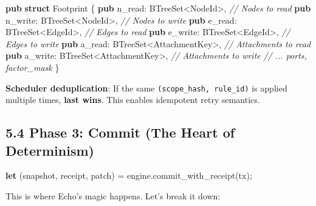 \documentclass[
  11pt,
]{book}
\newenvironment{Shaded}{}{}
\newcommand{\CommentTok}[1]{\textcolor[rgb]{0.38,0.63,0.69}{\textit{#1}}}
\newcommand{\KeywordTok}[1]{\textcolor[rgb]{0.00,0.44,0.13}{\textbf{#1}}}
\newcommand{\NormalTok}[1]{#1}
\newcommand{\OperatorTok}[1]{\textcolor[rgb]{0.40,0.40,0.40}{#1}}
\begin{document}
\begin{Shaded}
\begin{Highlighting}[]
\KeywordTok{pub} \KeywordTok{struct}\NormalTok{ Footprint }\OperatorTok{\{}
    \KeywordTok{pub}\NormalTok{ n\_read}\OperatorTok{:}\NormalTok{ BTreeSet}\OperatorTok{\textless{}}\NormalTok{NodeId}\OperatorTok{\textgreater{},}   \CommentTok{// Nodes to read}
    \KeywordTok{pub}\NormalTok{ n\_write}\OperatorTok{:}\NormalTok{ BTreeSet}\OperatorTok{\textless{}}\NormalTok{NodeId}\OperatorTok{\textgreater{},}  \CommentTok{// Nodes to write}
    \KeywordTok{pub}\NormalTok{ e\_read}\OperatorTok{:}\NormalTok{ BTreeSet}\OperatorTok{\textless{}}\NormalTok{EdgeId}\OperatorTok{\textgreater{},}   \CommentTok{// Edges to read}
    \KeywordTok{pub}\NormalTok{ e\_write}\OperatorTok{:}\NormalTok{ BTreeSet}\OperatorTok{\textless{}}\NormalTok{EdgeId}\OperatorTok{\textgreater{},}  \CommentTok{// Edges to write}
    \KeywordTok{pub}\NormalTok{ a\_read}\OperatorTok{:}\NormalTok{ BTreeSet}\OperatorTok{\textless{}}\NormalTok{AttachmentKey}\OperatorTok{\textgreater{},}  \CommentTok{// Attachments to read}
    \KeywordTok{pub}\NormalTok{ a\_write}\OperatorTok{:}\NormalTok{ BTreeSet}\OperatorTok{\textless{}}\NormalTok{AttachmentKey}\OperatorTok{\textgreater{},} \CommentTok{// Attachments to write}
    \CommentTok{// ... ports, factor\_mask}
\OperatorTok{\}}
\end{Highlighting}
\end{Shaded}

\textbf{Scheduler deduplication}: If the same
\texttt{(scope\_hash,\ rule\_id)} is applied multiple times,
\textbf{last wins}. This enables idempotent retry semantics.

\subsection{5.4 Phase 3: Commit (The Heart of
Determinism)}\label{phase-3-commit-the-heart-of-determinism}

\begin{Shaded}
\begin{Highlighting}[]
\KeywordTok{let}\NormalTok{ (snapshot}\OperatorTok{,}\NormalTok{ receipt}\OperatorTok{,}\NormalTok{ patch) }\OperatorTok{=}\NormalTok{ engine}\OperatorTok{.}\NormalTok{commit\_with\_receipt(tx)}\OperatorTok{;}
\end{Highlighting}
\end{Shaded}

This is where Echo's magic happens. Let's break it down:
\end{document}
